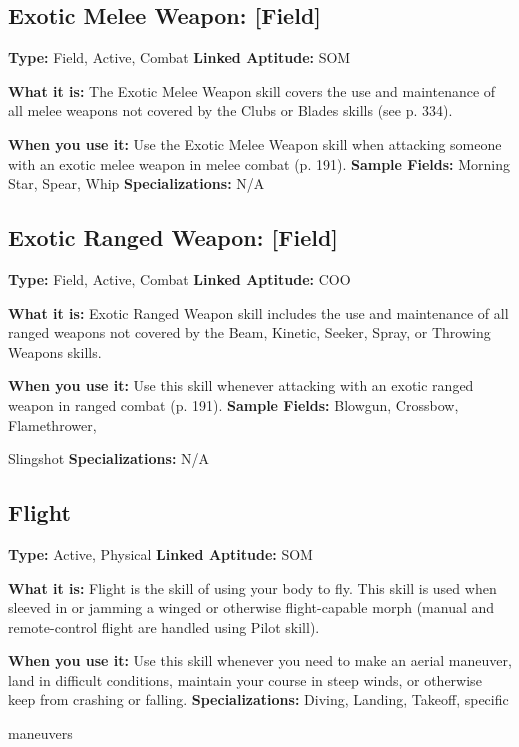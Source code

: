 \subsection{Exotic Melee Weapon: [Field]}

\textbf{Type:} Field, Active, Combat
\textbf{Linked Aptitude:} SOM

\textbf{What it is:} The Exotic Melee Weapon skill covers 
the use and maintenance of all melee weapons not 
covered by the Clubs or Blades skills (see p. 334).

\textbf{When you use it:} Use the Exotic Melee Weapon skill 
when attacking someone with an exotic melee weapon 
in melee combat (p. 191).
\textbf{Sample Fields:} Morning Star, Spear, Whip
\textbf{Specializations:} N/A

\subsection{Exotic Ranged Weapon: [Field]}

\textbf{Type:} Field, Active, Combat
\textbf{Linked Aptitude:} COO

\textbf{What it is:} Exotic Ranged Weapon skill includes the 
use and maintenance of all ranged weapons not covered
by the Beam, Kinetic, Seeker, Spray, or Throwing
Weapons skills.

\textbf{When you use it:} Use this skill whenever attacking with 
an exotic ranged weapon in ranged combat (p. 191).
\textbf{Sample Fields:} Blowgun, Crossbow, Flamethrower, 

Slingshot
\textbf{Specializations:} N/A

\subsection{Flight}

\textbf{Type:} Active, Physical
\textbf{Linked Aptitude:} SOM

\textbf{What it is:} Flight is the skill of using your body to 
fly. This skill is used when sleeved in or jamming a 
winged or otherwise flight-capable morph (manual and 
remote-control flight are handled using Pilot skill).

\textbf{When you use it:} Use this skill whenever you need to 
make an aerial maneuver, land in difficult conditions, 
maintain your course in steep winds, or otherwise 
keep from crashing or falling.
\textbf{Specializations:} Diving, Landing, Takeoff, specific 

maneuvers

